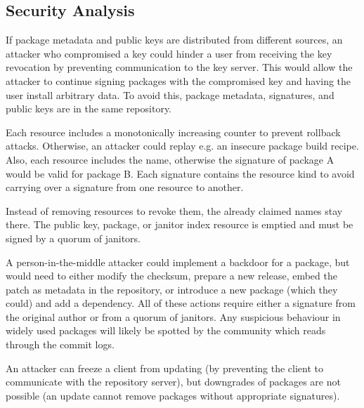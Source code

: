 \documentclass[nocopyrightspace]{sigplanconf}
\newcommand{\TODO}[1]{\textbf{[TODO: #1]}}
\begin{document}
\subsection{Security Analysis}

If package metadata and public keys are distributed from different sources, an attacker who compromised a key could hinder a user from receiving the key revocation by preventing communication to the key server.
This would allow the attacker to continue signing packages with the compromised key and having the user install arbitrary data.
To avoid this, package metadata, signatures, and public keys are in the same repository.

Each resource includes a monotonically increasing counter to prevent rollback attacks.
Otherwise, an attacker could replay e.g. an insecure package build recipe.
Also, each resource includes the name, otherwise the signature of package A would be valid for package B.
Each signature contains the resource kind to avoid carrying over a signature from one resource to another.

Instead of removing resources to revoke them, the already claimed names stay there.
The public key, package, or janitor index resource is emptied and must be signed by a quorum of janitors.

A person-in-the-middle attacker could implement a backdoor for a package, but would need to either modify the checksum, prepare a new release, embed the patch as metadata in the repository, or introduce a new package (which they could) and add a dependency.
All of these actions require either a signature from the original author or from a quorum of janitors.
Any suspicious behaviour in widely used packages will likely be spotted by the community which reads through the commit logs.

An attacker can freeze a client from updating (by preventing the client to communicate with the repository server), but downgrades of packages are not possible (an update cannot remove packages without appropriate signatures).
\end{document}
